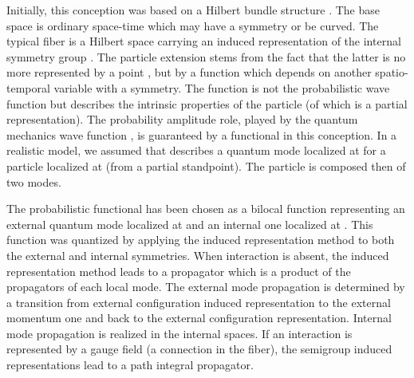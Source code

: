 \documentclass[12pt,a4paper]{article}
\begin{document}
Initially,\cite{Smida 1995} this conception was based on a Hilbert bundle
structure \coordHE{}. The base space \coordHE{} is ordinary
space-time which may have a \coordHE{} symmetry or be curved. The typical fiber
\coordHE{} is a Hilbert space carrying an induced representation\cite{Mensky
1976} \coordHE{} of the internal symmetry group
\coordHE{}. The particle extension stems from the fact that the latter is no
more represented by a point \coordHE{}, but by a function \coordHE{} which
depends on another spatio-temporal variable \myHighlight{$\xi$}\coordHE{} with a \coordHE{}
symmetry. The function \myHighlight{$\Psi$}\coordHE{} is not the probabilistic wave function but
describes the intrinsic properties of the particle (of which \coordHE{} is a partial
representation).\cite{Destouches 1956} The probability amplitude role, played
by the quantum mechanics wave function \coordHE{}, is guaranteed
by a functional\cite{Destouches 1956} \coordHE{} in this conception. In a
realistic model, we assumed that \coordHE{} describes a
quantum mode localized at \myHighlight{$\xi$}\coordHE{} for a particle localized at \coordHE{} (from a
partial standpoint). The particle is composed then of two modes.\cite{Smida 1995}

The probabilistic functional has been chosen as a bilocal function
\coordHE{} representing an external quantum mode localized
at \coordHE{} and an internal one localized at \myHighlight{$\xi$}\coordHE{}. This function was quantized by
applying the induced representation method to both the external and internal
symmetries. When interaction is absent, the induced representation method
leads to a propagator which is a product of the propagators of each local
mode. The external mode propagation is determined by a transition from
external configuration induced representation to the external momentum one and
back to the external configuration representation. Internal mode propagation
is realized in the internal spaces. If an interaction is represented by a
gauge field (a connection in the fiber), the semigroup induced representations
lead to a path integral propagator.\cite{Mensky 1983, Smida 1998}
\end{document}

